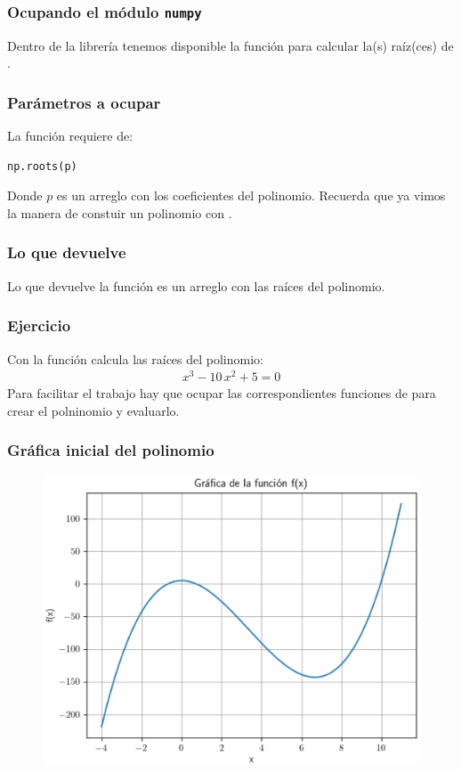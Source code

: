 \documentclass[12pt]{beamer}
\begin{document}
\begin{frame}
\frametitle{Ocupando el módulo \texttt{numpy}}
Dentro de la librería  tenemos disponible la función  para calcular la(s) raíz(ces) de .
\end{frame}
\begin{frame}[fragile]
\frametitle{Parámetros a ocupar}
La función  requiere de:
\begin{verbatim}
np.roots(p)
\end{verbatim}
Donde $p$ es un arreglo con los coeficientes del polinomio. \pause Recuerda que ya vimos la manera de constuir un polinomio con .
\end{frame}
\begin{frame}
\frametitle{Lo que devuelve}
Lo que devuelve la función  es un arreglo con las raíces del polinomio.
\end{frame}
\begin{frame}
\frametitle{Ejercicio}
Con la función  calcula las raíces del polinomio:
\pause
\begin{align*}
x^{3} - 10 \, x^{2} + 5 = 0
\end{align*}
Para facilitar el trabajo hay que ocupar las correspondientes funciones de  para crear el polninomio y evaluarlo.
\end{frame}
\begin{frame}
\frametitle{Gráfica inicial del polinomio}
\begin{figure}
    \centering
    \includegraphics[scale=0.55]{Imagenes/raices_numpy_roots_01.eps}
\end{figure}
\end{frame}
\end{document}
